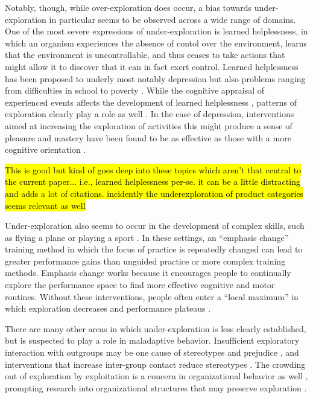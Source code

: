 \documentclass[10pt,letterpaper]{article}
\begin{document}
Notably, though, while over-exploration does occur, a bias towards under-exploration in particular seems to be
observed across a wide range of domains. One of the most severe
expressions of under-exploration is learned helplessness, in which an organism
experiences the absence of contol over the environment, learns that the
environment is uncontrollable, and thus ceases to take actions that might allow
it to discover that it can in fact exert control. Learned helplessness has been proposed to
underly most notably depression \citep{Abramson1978, Abramson1989} but also
problems ranging from difficulties in school \citep{Diener1978} to poverty \citep{Evans2005}.
While the cognitive appraisal of experienced events affects the development of
learned helplessness \citep{Abramson1978}, patterns of exploration clearly play
a role as well \citep{Huys2009, Teodorescu2014a}. In the case of depression,
interventions aimed at increasing the exploration of activities this might
produce a sense of pleasure and mastery have been found to be as effective as
those with a more cognitive orientation \citep{Jacobson1996}.

\hl{This is good but kind of goes deep into these topics which aren't that central
to the current paper... i.e., learned helplessness per-se.  it can be a little distracting
and adds a lot of citations.  incidently the underexploration of product categories
seems relevant as well}

Under-exploration also seems to occur in the development of complex skills, such
as flying a plane or playing a sport \citep{Gopher1989}. In these settings, an ``emphasis
change'' training method in which the focus of practice is repeatedly changed
can lead to greater performance gains than unguided practice or more complex
training methods. Emphasis change works because it encourages people to
continually explore the performance space to find more effective cognitive and
motor routines. Without these interventions, people often enter a ``local
maximum'' in which exploration decreases and performance plateaus \citep{Yechiam2001}.

There are many other areas in which under-exploration is less clearly
established, but is suspected to play a role in maladaptive behavior.
Insufficient exploratory interaction with outgroups may be one cause of
stereotypes and prejudice \citep{Denrell2005most}, and interventions that
increase inter-group contact reduce stereotypes \citep{Shook2008}. The crowding
out of exploration by exploitation is a concern in organizational behavior as
well \citep{March1991, Levinthal1993}, prompting research into organizational
structures that may preserve exploration \citep{Fang2010}.
\end{document}
